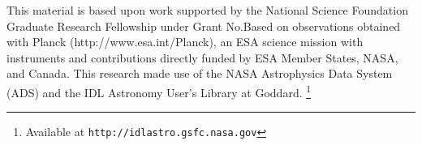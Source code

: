 \documentclass{emulateapj}
\begin{document}
This material is based upon work supported by the National Science Foundation 
Graduate Research Fellowship under Grant No.Based on observations obtained with
 Planck (http://www.esa.int/Planck), an ESA science mission with instruments 
and contributions directly funded by ESA Member States, NASA, and Canada. This 
research made use of the NASA Astrophysics Data System (ADS) and the IDL 
Astronomy User's Library at Goddard. \footnote{Available at 
\texttt{http://idlastro.gsfc.nasa.gov}}



\end{document}
